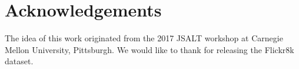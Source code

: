\documentclass[a4paper]{article}
\begin{document}
\section{Acknowledgements}
The idea of this work originated from the 2017 JSALT workshop at Carnegie Mellon University, Pittsburgh. We would like to thank \cite{Hodosh2010} for releasing the Flickr8k dataset.





\end{document}
